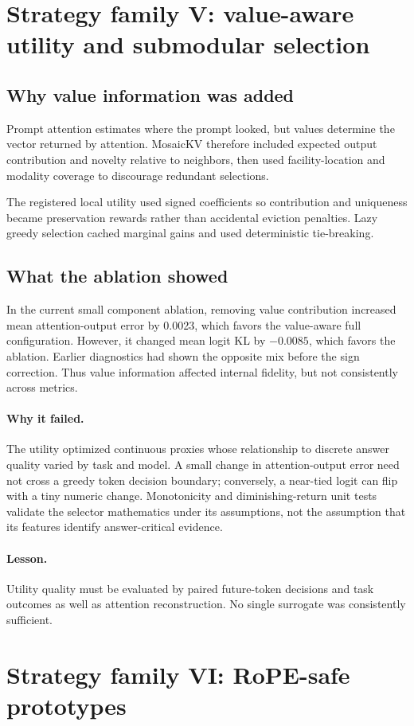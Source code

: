 \documentclass[11pt]{article}
\newcommand{\lesson}{\paragraph{Lesson.}}
\newcommand{\failure}{\paragraph{Why it failed.}}
\begin{document}
\section{Strategy family V: value-aware utility and submodular selection}

\subsection{Why value information was added}

Prompt attention estimates where the prompt looked, but values determine the vector returned by
attention.  MosaicKV therefore included expected output contribution and novelty relative to
neighbors, then used facility-location and modality coverage to discourage redundant selections.

The registered local utility used signed coefficients so contribution and uniqueness became
preservation rewards rather than accidental eviction penalties.  Lazy greedy selection cached
marginal gains and used deterministic tie-breaking.

\subsection{What the ablation showed}

In the current small component ablation, removing value contribution increased mean
attention-output error by 0.0023, which favors the value-aware full configuration.  However, it
changed mean logit KL by $-0.0085$, which favors the ablation.  Earlier diagnostics had shown the
opposite mix before the sign correction.  Thus value information affected internal fidelity, but
not consistently across metrics.

\failure
The utility optimized continuous proxies whose relationship to discrete answer quality varied by
task and model.  A small change in attention-output error need not cross a greedy token decision
boundary; conversely, a near-tied logit can flip with a tiny numeric change.  Monotonicity and
diminishing-return unit tests validate the selector mathematics under its assumptions, not the
assumption that its features identify answer-critical evidence.

\lesson
Utility quality must be evaluated by paired future-token decisions and task outcomes as well as
attention reconstruction.  No single surrogate was consistently sufficient.

\section{Strategy family VI: RoPE-safe prototypes}
\end{document}
